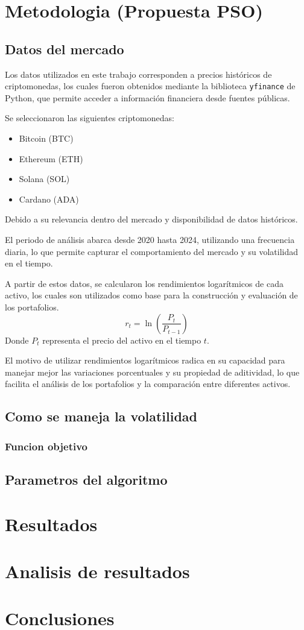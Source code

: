 \section{Metodologia (Propuesta PSO)}
\subsection{Datos del mercado}

Los datos utilizados en este trabajo corresponden a precios
históricos de criptomonedas, los cuales fueron obtenidos mediante la
biblioteca \texttt{yfinance} de Python, que permite acceder a
información financiera desde fuentes públicas.

Se seleccionaron las siguientes criptomonedas:
\begin{itemize}
  \item Bitcoin (BTC)
  \item Ethereum (ETH)
  \item Solana (SOL)
  \item Cardano (ADA)
\end{itemize}

Debido a su relevancia dentro del mercado y
disponibilidad de datos históricos.

El periodo de análisis abarca desde 2020 hasta 2024, utilizando una
frecuencia diaria, lo que permite capturar el
comportamiento del mercado y su volatilidad en el tiempo.

A partir de estos datos, se calcularon los rendimientos logarítmicos
de cada activo, los cuales son utilizados como base para la
construcción y evaluación de los portafolios.
\begin{equation}
  r_t = \ln\left(\frac{P_t}{P_{t-1}}\right)
\end{equation}
Donde \( P_t \) representa el precio del activo en el tiempo \( t \).

El motivo de utilizar rendimientos logarítmicos radica en su
capacidad para manejar mejor las variaciones porcentuales y su
propiedad de aditividad, lo que facilita el análisis de los
portafolios y la comparación entre diferentes activos.
\subsection{Como se maneja la volatilidad}
\subsubsection{Funcion objetivo}
\subsection{Parametros del algoritmo}
\section{Resultados}
\section{Analisis de resultados}
\section{Conclusiones}
